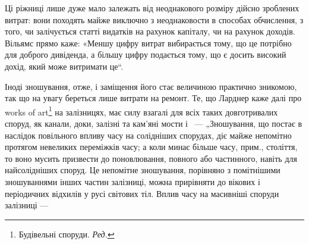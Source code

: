 \noindent{}Ці ріжниці лише дуже мало залежать від неоднакового розміру дійсно зроблених витрат: вони походять
майже виключно з неоднаковости в способах обчислення, з того, чи залічується статті видатків на
рахунок капіталу, чи на рахунок доходів. Вільямс прямо каже: «Меншу цифру витрат вибирається тому,
що це потрібно для доброго дивіденда, а більшу цифру подається тому, що є досить високий дохід, який
може витримати це“.

Іноді зношування, отже, і заміщення його стає величиною практично зникомою, так що на увагу береться
лише витрати на ремонт. Те, що Ларднер каже далі про works of art\footnote*{
Будівельні споруди. \emph{Ред.}
} на залізницях, має силу взагалі
для всіх таких довготривалих споруд, як канали, доки, залізні та кам’яні мости і~ —
„Зношування, що постає в наслідок повільного впливу часу на солідніших спорудах, діє майже непомітно
протягом невеликих переміжків часу; а коли минає більше часу, прим., століття, то воно мусить
призвести до поновлювання, повного або частинного, навіть для найсолідніших споруд. Це непомітне
зношування, порівняно з помітнішими зношуваннями інших частин залізниці, можна прирівняти до вікових
і періодичних відхилів у русі світових тіл. Вплив часу на масивніші споруди залізниці —
\parbreak{}  %
